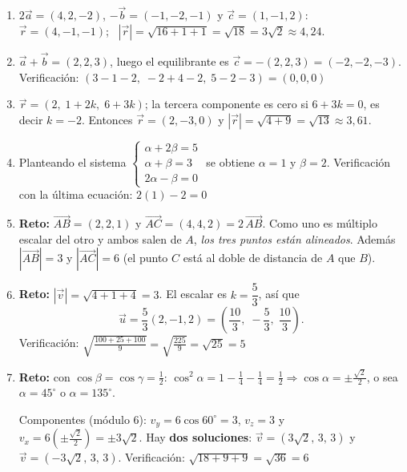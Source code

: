 \documentclass[12pt, letterpaper]{article}
\begin{document}
\begin{enumerate}[leftmargin=*, label=\textbf{\arabic*.}]
          Componentes: $v_x = 14 \cdot \tfrac{3}{7} = 6$, $v_y = 14 \cdot \tfrac{2}{7} = 4$ y $v_z = 14 \cdot \left(\pm\tfrac{6}{7}\right) = \pm 12$. Las dos ternas son $\vec{v} = (6, 4, 12)$ y $\vec{v} = (6, 4, -12)$: se diferencian en el sentido vertical (arriba o abajo) y ambas tienen módulo $14$ \checkmark.
    \item $2\vec{a} = (4, 2, -2)$, $-\vec{b} = (-1, -2, -1)$ y $\vec{c} = (1, -1, 2)$: \ $\vec{r} = (4, -1, -1)$; \ $|\vec{r}| = \sqrt{16 + 1 + 1} = \sqrt{18} = 3\sqrt{2} \approx 4{,}24$.
    \item $\vec{a} + \vec{b} = (2, 2, 3)$, luego el equilibrante es $\vec{c} = -(2, 2, 3) = (-2, -2, -3)$. Verificación: $(3 - 1 - 2,\; -2 + 4 - 2,\; 5 - 2 - 3) = (0, 0, 0)$ \checkmark
    \item $\vec{r} = (2,\; 1 + 2k,\; 6 + 3k)$; la tercera componente es cero si $6 + 3k = 0$, es decir $k = -2$. Entonces $\vec{r} = (2, -3, 0)$ y $|\vec{r}| = \sqrt{4 + 9} = \sqrt{13} \approx 3{,}61$.
    \item Planteando el sistema $\begin{cases} \alpha + 2\beta = 5 \\ \alpha + \beta = 3 \\ 2\alpha - \beta = 0 \end{cases}$ se obtiene $\alpha = 1$ y $\beta = 2$. Verificación con la última ecuación: $2(1) - 2 = 0$ \checkmark
    \item \textbf{Reto:} $\overrightarrow{AB} = (2, 2, 1)$ y $\overrightarrow{AC} = (4, 4, 2) = 2\,\overrightarrow{AB}$. Como uno es múltiplo escalar del otro y ambos salen de $A$, \emph{los tres puntos están alineados}. Además $|\overrightarrow{AB}| = 3$ y $|\overrightarrow{AC}| = 6$ (el punto $C$ está al doble de distancia de $A$ que $B$).
    \item \textbf{Reto:} $|\vec{v}| = \sqrt{4 + 1 + 4} = 3$. El escalar es $k = \dfrac{5}{3}$, así que
          $$\vec{u} = \frac{5}{3}(2, -1, 2) = \left(\frac{10}{3},\; -\frac{5}{3},\; \frac{10}{3}\right).$$
          Verificación: $\sqrt{\tfrac{100 + 25 + 100}{9}} = \sqrt{\tfrac{225}{9}} = \sqrt{25} = 5$ \checkmark
    \item \textbf{Reto:} con $\cos\beta = \cos\gamma = \tfrac{1}{2}$: $\cos^2\alpha = 1 - \tfrac{1}{4} - \tfrac{1}{4} = \tfrac{1}{2} \Rightarrow \cos\alpha = \pm\tfrac{\sqrt{2}}{2}$, o sea $\alpha = 45^{\circ}$ o $\alpha = 135^{\circ}$.

          Componentes (módulo $6$): $v_y = 6\cos 60^{\circ} = 3$, $v_z = 3$ y $v_x = 6\left(\pm\tfrac{\sqrt{2}}{2}\right) = \pm 3\sqrt{2}$. Hay \textbf{dos soluciones}: $\vec{v} = (3\sqrt{2},\, 3,\, 3)$ y $\vec{v} = (-3\sqrt{2},\, 3,\, 3)$. Verificación: $\sqrt{18 + 9 + 9} = \sqrt{36} = 6$ \checkmark
  \end{enumerate}
\end{document}
